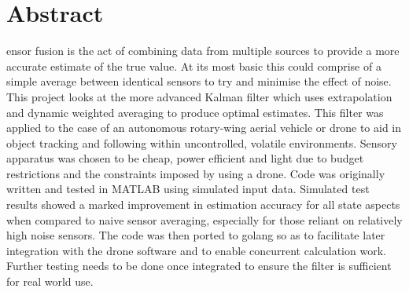 %
%
%

\chapter*{Abstract}
\begin{SingleSpace}

ensor fusion is the act of combining data from multiple sources to provide a more accurate estimate of the true value. At its most basic this could comprise of a simple average between identical sensors to try and minimise the effect of noise. This project looks at the more advanced Kalman filter which uses extrapolation and dynamic weighted averaging to produce optimal estimates. This filter was applied to the case of an autonomous rotary-wing aerial vehicle or drone to aid in object tracking and following within uncontrolled, volatile environments. Sensory apparatus was chosen to be cheap, power efficient and light due to budget restrictions and the constraints imposed by using a drone. Code was originally written and tested in MATLAB using simulated input data. Simulated test results showed a marked improvement in estimation accuracy for all state aspects when compared to naive sensor averaging, especially for those reliant on relatively high noise sensors. The code was then ported to golang so as to facilitate later integration with the drone software and to enable concurrent calculation work. Further testing needs to be done once integrated to ensure the filter is sufficient for real world use. \par



\end{SingleSpace}
\clearpage
